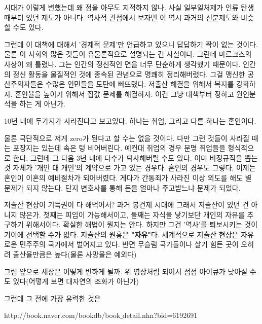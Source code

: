 시대가 이렇게 변했는데 왜 점을 아무도 지적하지 않나.
사실 일부일처제가 인류 탄생 때부터 있던 제도가 아니다. 역사적 관점에서 보자면 이 역시 과거의 신분제도와 비슷할 수도 있다.
\vspace{5mm}

그런데 이 대책에 대해서 '경제적 문제'만 언급하고 있으니 답답하기 짝이 없는 것이다.
물론 이 사회의 많은 것들이 유물론적으로 설명되는 건 사실이다.
그런데 마르크스의 사상이 왜 틀렸나. 그는 인간의 정신적인 면을 너무 단순하게 생각했기 때문이다.
인간의 정신 활동을 물질적인 것에 종속된 관념으로 명쾌히 정리해버렸다. 그걸 맹신한 공산주의자들은 수많은 인민들을 도탄에 빠뜨렸다.
저출산 해결을 위해서 복지를 강화하자, 혼인율을 높이기 위해서 집값 문제를 해결하자. 이건 그냥 대책부터 정하고 원인분석을 하는 게 아닌가.
\vspace{5mm}

10년 내에 두가지가 사라진다고 보고있다.
하나는 취업, 그리고 다른 하나는 혼인이다.
\vspace{5mm}

물론 극단적으로 저게 zero가 된다고 할 수는 없을 것이다. 다만 그런 것들이 사라질 때는 포장지는 있는데 속은 텅 비어버린다.
예컨대 취업의 경우 분명 취업들을 형식적으로 한다, 그런데 그 다음 3년 내에 다수가 퇴사해버릴 수도 있다.
이미 비정규직을 뽑는 것 자체가 '개인 대 개인'의 계약으로 가고 있는 경우다.
혼인의 경우도 그렇다, 이제는 혼인이 이혼의 예비절차가 되어버렸다.
게다가 간통죄가 사라진 이상 외도를 해도 별 문제가 되지 않는다. 단지 변호사를 통해 돈을 얼마나 주고받느냐 문제가 되었다.
\vspace{5mm}

저출산 현상이 기득권이 다 해먹어서?
과거 봉건제 시대에 그래서 저출산이 있던 건 아니지 않은가.
첫째는 피임이 가능해서이고, 둘째는 자식을 낳기보단 개인의 자유를 추구하기 위해서이다.
확실한 해법이 뭔지는 안다. 하지만 그건 '역사'를 퇴보시키는 것이기이에 선택할 수가 없다.
저출산의 원흉은 \textbf{"자유"}다.
세계적으로 저출산 현상은 자유로운 민주주의 국가에서 벌어지고 있다.
반면 무슬림 국가들이나 살기 힘든 곳이 오히려 출산율만큼은 높다(물론 사망율은 예외다)
\vspace{5mm}

그럼 앞으로 세상은 어떻게 변하게 될까.
위 영상처럼 되어서 점점 아이큐가 낮아질 수도 있다(어떻게 보면 대자연의 조화가 아닌가)
\vspace{5mm}

그런데 그 전에 가장 유력한 것은
\vspace{5mm}

http://book.naver.com/bookdb/book$\_$detail.nhn?bid=6192691
\vspace{5mm}

